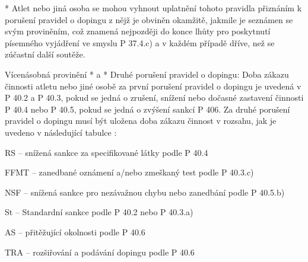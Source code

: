  * Atlet nebo jiná osoba se mohou vyhnout uplatnění tohoto pravidla přiznáním k porušení pravidel o dopingu z nějž je obviněn okamžitě, jakmile je seznámen se svým proviněním, což znamená nejpozději do konce lhůty pro poskytnutí písemného vyjádření ve smyslu P 37.4.c) a v každém případě dříve, než se zúčastní další soutěže.
  \enditems

Vícenásobná provinění
* \begitems \style a
  * Druhé porušení pravidel o dopingu: Doba zákazu činnosti atletu nebo jiné osobě za první porušení pravidel o dopingu je uvedená v P 40.2 a P 40.3, pokud se jedná o zrušení, snížení nebo dočasné zastavení činnosti P 40.4 nebo P 40.5, pokud se jedná o zvýšení sankcí P 406. Za druhé porušení pravidel o dopingu musí být uložena doba zákazu činnost v rozsahu, jak je uvedeno v následující tabulce :


\noindent RS -- snížená sankce za specifikované látky podle P 40.4

\noindent FFMT -- zanedbané oznámení a/nebo zmeškaný test podle P 40.3.c)

\noindent NSF -- snížená sankce pro nezávažnou chybu nebo zanedbání podle P 40.5.b)

\noindent St -- Standardní sankce podle P 40.2 nebo P 40.3.a)

\noindent AS -- přitěžující okolnosti podle P 40.6

\noindent TRA -- rozšiřování a podávání dopingu podle P 40.6

